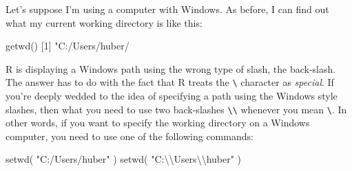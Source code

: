 \documentclass[
  12pt,
  oneside]{book}
\newenvironment{Shaded}{\begin{snugshade}}{\end{snugshade}}
\newcommand{\DecValTok}[1]{\textcolor[rgb]{0.00,0.00,0.81}{#1}}
\newcommand{\FunctionTok}[1]{\textcolor[rgb]{0.00,0.00,0.00}{#1}}
\newcommand{\NormalTok}[1]{#1}
\newcommand{\SpecialCharTok}[1]{\textcolor[rgb]{0.00,0.00,0.00}{#1}}
\newcommand{\StringTok}[1]{\textcolor[rgb]{0.31,0.60,0.02}{#1}}
\theoremstyle{definition}
\theoremstyle{definition}
\theoremstyle{definition}
\theoremstyle{definition}
\theoremstyle{remark}
\begin{document}
Let's suppose I'm using a computer with Windows. As before, I can find out what my current working directory is like this:

\begin{Shaded}
\begin{Highlighting}[]
\FunctionTok{getwd}\NormalTok{()}
\NormalTok{[}\DecValTok{1}\NormalTok{] }\StringTok{"C:/Users/huber/}
\end{Highlighting}
\end{Shaded}

R is displaying a Windows path using the wrong type of slash, the back-slash. The answer has to do with the fact that R treats the \texttt{\textbackslash{}} character as \emph{special}. If you're deeply wedded to the idea of specifying a path using the Windows style slashes, then what you need to use two back-slashes \texttt{\textbackslash{}\textbackslash{}} whenever you mean \texttt{\textbackslash{}}. In other words, if you want to specify the working directory on a Windows computer, you need to use one of the following commands:

\begin{Shaded}
\begin{Highlighting}[]
\FunctionTok{setwd}\NormalTok{( }\StringTok{"C:/Users/huber"}\NormalTok{ )}
\FunctionTok{setwd}\NormalTok{( }\StringTok{"C:}\SpecialCharTok{\textbackslash{}\textbackslash{}}\StringTok{Users}\SpecialCharTok{\textbackslash{}\textbackslash{}}\StringTok{huber"}\NormalTok{ )}
\end{Highlighting}
\end{Shaded}


  
\end{document}
